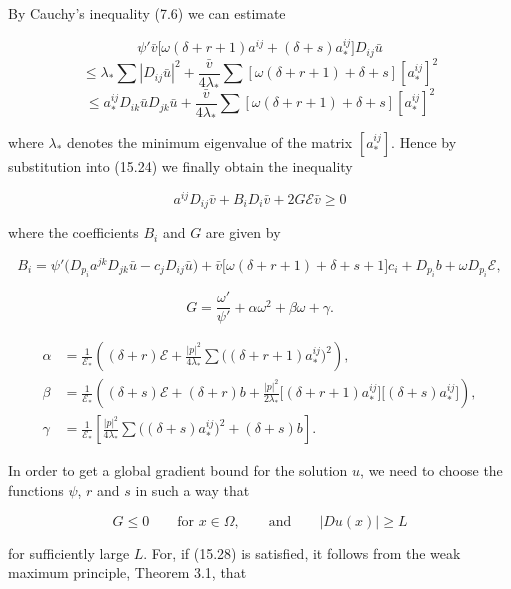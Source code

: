 By Cauchy's inequality (7.6) we can estimate

\[
\psi'\bar{v}\bigl[\omega(\delta+r+1)a^{ij}+(\delta+s)a^{ij}_{*}\bigr]D_{ij}\bar{u}
\]
\[
\le \lambda_{*}\sum\left|D_{ij}\bar{u}\right|^2+\frac{\bar{v}}{4\lambda_{*}}
\sum\left[\omega(\delta+r+1)+\delta+s\right]\left[a^{ij}_{*}\right]^2
\]
\[
\le a^{ij}_{*}D_{ik}\bar{u}D_{jk}\bar{u}+\frac{\bar{v}}{4\lambda_{*}}
\sum\left[\omega(\delta+r+1)+\delta+s\right]\left[a^{ij}_{*}\right]^2
\]

where $\lambda_{*}$ denotes the minimum eigenvalue of the matrix $[a^{ij}_{*}]$. Hence by substitution
into (15.24) we finally obtain the inequality

\begin{equation}
a^{ij}D_{ij}\bar{v}+B_iD_i\bar{v}+2G\mathcal{E}\bar{v}\ge 0
\tag{15.25}
\end{equation}

where the coefficients $B_i$ and $G$ are given by

\begin{equation}
B_i=\psi'\bigl(D_{p_i}a^{jk}D_{jk}\bar{u}-c_jD_{ij}\bar{u}\bigr)+\bar{v}\bigl[\omega(\delta+r+1)+\delta+s+1\bigr]c_i
+D_{p_i}b+\omega D_{p_i}\mathcal{E},
\tag{15.26}
\end{equation}

\[
G=\frac{\omega'}{\psi'}+\alpha\omega^2+\beta\omega+\gamma.
\]


\[
\begin{aligned}
\alpha &= \frac{1}{\mathcal{E}_*}\left((\delta+r)\mathcal{E} + \frac{|p|^2}{4\lambda_*}\sum\bigl((\delta+r+1)a_*^{ij}\bigr)^2\right),\\
\beta &= \frac{1}{\mathcal{E}_*}\left((\delta+s)\mathcal{E}+(\delta+r)b+\frac{|p|^2}{2\lambda_*}\bigl[(\delta+r+1)a_*^{ij}\bigr]\bigl[(\delta+s)a_*^{ij}\bigr]\right),\\
\gamma &= \frac{1}{\mathcal{E}_*}\left[\frac{|p|^2}{4\lambda_*}\sum\bigl((\delta+s)a_*^{ij}\bigr)^2+(\delta+s)b\right].
\end{aligned}
\]

In order to get a global gradient bound for the solution \(u\), we need to choose the functions \(\psi\), \(r\) and \(s\) in such a way that

\begin{equation}\tag{15.28}
G\le 0 \qquad \text{for } x\in \Omega,\qquad \text{and}\qquad |Du(x)|\ge L
\end{equation}

for sufficiently large \(L\). For, if (15.28) is satisfied, it follows from the weak maximum principle, Theorem 3.1, that

